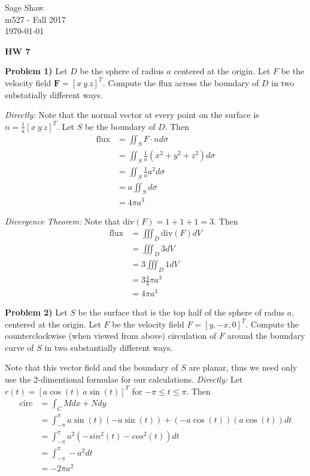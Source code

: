 \documentclass[12pt]{article}
\newcommand{\problem}[1]{\hspace{-4 ex} \large \textbf{Problem #1} }
\begin{document}
	\thispagestyle{empty}
	
	\begin{flushright}
		Sage Shaw \\
		m527 - Fall 2017 \\
		\today
	\end{flushright}
	
{\large \textbf{HW 7}}\bigbreak

\problem{1)} Let $D$ be the sphere of radius $a$ centered at the origin. Let $F$ be the velocity field $\textbf{F} = [x \ y \ z]^T$. Compute the flux across the boundary of $D$ in two substatially different ways. \bigbreak

	\emph{Directly:} Note that the normal vector at every point on the surface is $n = \tfrac{1}{a}[x \ y \ z]^T$. Let $S$ be the boundary of $D$. Then
	\begin{align*}
		\text{flux} & = \iint_S F \cdot n d\sigma \\
		& = \iint_S \tfrac{1}{a}(x^2 + y^2 + z^2) d\sigma \\
		& = \iint_S \tfrac{1}{a}a^2 d\sigma \\
		& = a \iint_S d\sigma \\
		& = 4 \pi a^3
	\end{align*}
	
	\bigbreak
	
	\emph{Divergence Theorem:} Note that $\text{div}(F) = 1+1+1 = 3$. Then
	\begin{align*}
	\text{flux} & = \iiint_D \text{div}(F) dV \\
	& = \iiint_D 3 dV \\
	& = 3 \iiint_D 1 dV \\
	& = 3 \tfrac{4}{3}\pi a^3 \\
	& = 4 \pi a^3 
	\end{align*}
	
\problem{2)} Let $S$ be the surface that is the top half of the sphere of radus $a$, centered at the origin. Let $F$ be the velocity field $F = [y, -x, 0]^T$. Compute the counterclockwise (when viewed from above) circulation of $F$ around the boundary curve of $S$ in two substantially different ways. \bigbreak

	Note that this vector field and the boundary of $S$ are planar, thus we need only use the 2-dimentional formulae for our calculations.
	\emph{Directly:} Let $r(t) = [a\cos(t) \ a\sin(t)]^T$ for $-\pi \leq t \leq \pi$. Then 
	\begin{align*}
		\text{circ} &= \int_C M dx + N dy \\
		& = \int_{-\pi}^\pi a\sin(t) (-a\sin(t)) + (-a\cos(t))(a\cos(t)) dt \\
		& = \int_{-\pi}^\pi a^2(-sin^2(t)-cos^2(t)) dt \\
		& = \int_{-\pi}^\pi -a^2 dt \\
		& = -2\pi a^2
	\end{align*}
	
\end{document}
